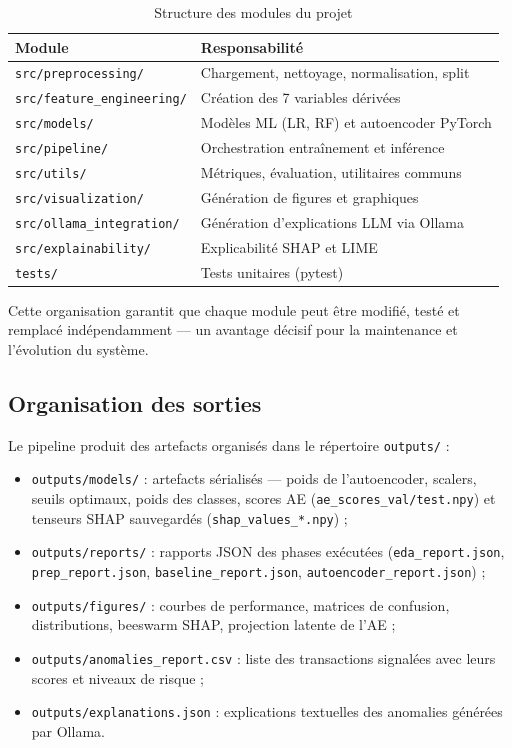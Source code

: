\begin{table}[H]
\centering
\caption{Structure des modules du projet}
\label{tab:modules}
\begin{tabular}{p{4.5cm}p{8cm}}
\toprule
\textbf{Module} & \textbf{Responsabilité} \\
\midrule
\texttt{src/preprocessing/}        & Chargement, nettoyage, normalisation, split \\
\texttt{src/feature\_engineering/} & Création des 7 variables dérivées \\
\texttt{src/models/}               & Modèles ML (LR, RF) et autoencoder PyTorch \\
\texttt{src/pipeline/}             & Orchestration entraînement et inférence \\
\texttt{src/utils/}                & Métriques, évaluation, utilitaires communs \\
\texttt{src/visualization/}        & Génération de figures et graphiques \\
\texttt{src/ollama\_integration/}  & Génération d'explications LLM via Ollama \\
\texttt{src/explainability/}       & Explicabilité SHAP et LIME \\
\texttt{tests/}                    & Tests unitaires (pytest) \\
\bottomrule
\end{tabular}
\end{table}

Cette organisation garantit que chaque module peut être modifié, testé et remplacé
indépendamment --- un avantage décisif pour la maintenance et l'évolution du système.

\subsection{Organisation des sorties}

Le pipeline produit des artefacts organisés dans le répertoire \texttt{outputs/} :

\begin{itemize}
  \item \texttt{outputs/models/} : artefacts sérialisés --- poids de l'autoencoder,
    scalers, seuils optimaux, poids des classes, scores AE
    (\texttt{ae\_scores\_val/test.npy}) et tenseurs SHAP sauvegardés
    (\texttt{shap\_values\_*.npy}) ;
  \item \texttt{outputs/reports/} : rapports JSON des phases exécutées
    (\texttt{eda\_report.json}, \texttt{prep\_report.json},
    \texttt{baseline\_report.json}, \texttt{autoencoder\_report.json}) ;
  \item \texttt{outputs/figures/} : courbes de performance, matrices de confusion,
    distributions, beeswarm SHAP, projection latente de l'AE ;
  \item \texttt{outputs/anomalies\_report.csv} : liste des transactions signalées avec
    leurs scores et niveaux de risque ;
  \item \texttt{outputs/explanations.json} : explications textuelles des anomalies
    générées par Ollama.
\end{itemize}

